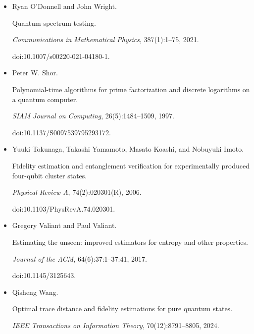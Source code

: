 \begin{itemize}
doi:10.1145/2897518.2897544.





\item[] 
[35]

Ryan O’Donnell and John Wright.


Quantum spectrum testing.


\emph{Communications in Mathematical Physics}, 387(1):1–75, 2021.


doi:10.1007/s00220-021-04180-1.





\item[] 
[36]

Peter W. Shor.


Polynomial-time algorithms for prime factorization and discrete
logarithms on a quantum computer.


\emph{SIAM Journal on Computing}, 26(5):1484–1509, 1997.


doi:10.1137/S0097539795293172.





\item[] 
[37]

Yuuki Tokunaga, Takashi Yamamoto, Masato Koashi, and Nobuyuki Imoto.


Fidelity estimation and entanglement verification for experimentally
produced four-qubit cluster states.


\emph{Physical Review A}, 74(2):020301(R), 2006.


doi:10.1103/PhysRevA.74.020301.





\item[] 
[38]

Gregory Valiant and Paul Valiant.


Estimating the unseen: improved estimators for entropy and other
properties.


\emph{Journal of the ACM}, 64(6):37:1–37:41, 2017.


doi:10.1145/3125643.





\item[] 
[39]

Qisheng Wang.


Optimal trace distance and fidelity estimations for pure quantum
states.


\emph{IEEE Transactions on Information Theory}, 70(12):8791–8805,
2024.



\end{itemize}
